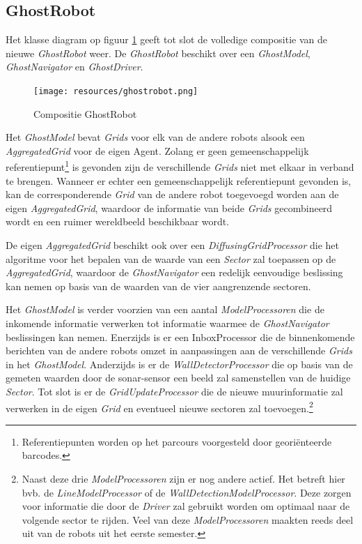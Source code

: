 \documentclass[12pt,a4paper]{report}
\begin{document}
\subsection{GhostRobot}

Het klasse diagram op figuur \ref{uml:ghostrobot} geeft tot slot de volledige compositie van de nieuwe \emph{GhostRobot} weer. De \emph{GhostRobot} beschikt over een \emph{GhostModel}, \emph{GhostNavigator} en \emph{GhostDriver}.

\begin{figure}[htbp]
  \centering
  \texttt{[image: resources/ghostrobot.png]}
  \caption{Compositie GhostRobot}
  \label{uml:ghostrobot}
\end{figure}

Het \emph{GhostModel} bevat \emph{Grids} voor elk van de andere robots alsook een \emph{AggregatedGrid} voor de eigen Agent. Zolang er geen gemeenschappelijk referentiepunt\footnote{Referentiepunten worden op het parcours voorgesteld door geori\"enteerde barcodes.} is gevonden zijn de verschillende \emph{Grids} niet met elkaar in verband te brengen. Wanneer er echter een gemeenschappelijk referentiepunt gevonden is, kan de corresponderende \emph{Grid} van de andere robot toegevoegd worden aan de eigen \emph{AggregatedGrid}, waardoor de informatie van beide \emph{Grids} gecombineerd wordt en een ruimer wereldbeeld beschikbaar wordt.

De eigen \emph{AggregatedGrid} beschikt ook over een \emph{DiffusingGridProcessor} die het algoritme voor het bepalen van de waarde van een \emph{Sector} zal toepassen op de \emph{AggregatedGrid}, waardoor de \emph{GhostNavigator} een redelijk eenvoudige beslissing kan nemen op basis van de waarden van de vier aangrenzende sectoren.

Het \emph{GhostModel} is verder voorzien van een aantal \emph{ModelProcessoren} die de inkomende informatie verwerken tot informatie waarmee de \emph{GhostNavigator} beslissingen kan nemen. Enerzijds is er een InboxProcessor die de binnenkomende berichten van de andere robots omzet in aanpassingen aan de verschillende \emph{Grids} in het \emph{GhostModel}. Anderzijds is er de \emph{WallDetectorProcessor} die op basis van de gemeten waarden door de sonar-sensor een beeld zal samenstellen van de huidige \emph{Sector}. Tot slot is er de \emph{GridUpdateProcessor} die de nieuwe muurinformatie zal verwerken in de eigen \emph{Grid} en eventueel nieuwe sectoren zal toevoegen.\footnote{Naast deze drie \emph{ModelProcessoren} zijn er nog andere actief. Het betreft hier bvb. de \emph{LineModelProcessor} of de \emph{WallDetectionModelProcessor}. Deze zorgen voor informatie die door de \emph{Driver} zal gebruikt worden om optimaal naar de volgende sector te rijden. Veel van deze \emph{ModelProcessoren} maakten reeds deel uit van de robots uit het eerste semester.}
\end{document}
